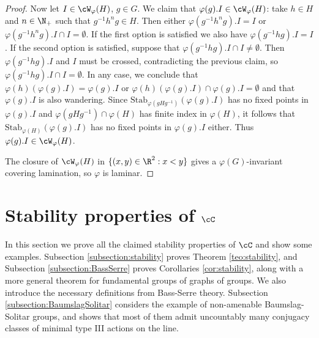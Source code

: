 \documentclass[reqno]{amsart}
\begin{document}
\begin{proof}
Now let $I \in \cW_\varphi(H)$, $g \in G$. We claim that $\varphi(g).I \in \cW_\varphi(H)$: take $h \in H$ and $n \in \N_+$ such that $g^{-1}h^ng \in H$. Then either $\varphi(g^{-1}h^ng).I = I$ or $\varphi(g^{-1}h^ng).I \cap I = \emptyset$. If the first option is satisfied we also have $\varphi(g^{-1}hg).I = I$. If the second option is satisfied, suppose that $\varphi(g^{-1}hg).I\cap I \neq \emptyset$. Then $\varphi(g^{-1}hg).I$ and $I$ must be crossed, contradicting the previous claim, so $\varphi(g^{-1}hg).I \cap I = \emptyset$. In any case, we conclude that $\varphi(h)\left(\varphi(g).I\right) = \varphi(g).I$ or $\varphi(h)\left(\varphi(g).I\right) \cap \varphi(g).I = \emptyset$ and that $\varphi(g).I$ is also wandering. Since $\mathrm{Stab}_{\varphi(gHg^{-1})}(\varphi(g).I)$ has no fixed points in $\varphi(g).I$ and $\varphi(gHg^{-1}) \cap \varphi(H)$ has finite index in $\varphi(H)$, it follows that $\mathrm{Stab}_{\varphi(H)}(\varphi(g).I)$ has no fixed points in $\varphi(g).I$ either. Thus $\varphi(g).I \in \cW_\varphi(H)$.


        The closure of $\cW_\varphi(H)$ in $\{(x,y) \in \R^2 : x < y\}$ gives a $\varphi(G)$-invariant covering lamination, so $\varphi$ is laminar.%
\end{proof}


\section{Stability properties of $\cC$} \label{section:stability}
In this section we prove all the claimed stability properties of $\cC$ and show some examples. Subsection \ref{subsection:stability} proves Theorem \ref{teo:stability}, and Subsection \ref{subsection:BassSerre} proves Corollaries \ref{cor:stability}, along with a more general theorem for fundamental groups of graphs of groups. We also introduce the necessary definitions from Bass-Serre theory. Subsection \ref{subsection:BaumslagSolitar} considers the example of non-amenable Baumslag-Solitar groups, and shows that most of them admit uncountably many conjugacy classes of minimal type III actions on the line. 
\end{document}
